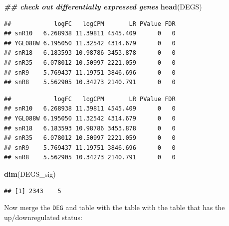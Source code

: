 \documentclass[
]{book}
\newenvironment{Shaded}{\begin{snugshade}}{\end{snugshade}}
\newcommand{\DocumentationTok}[1]{\textcolor[rgb]{0.56,0.35,0.01}{\textbf{\textit{#1}}}}
\newcommand{\FloatTok}[1]{\textcolor[rgb]{0.00,0.00,0.81}{#1}}
\newcommand{\FunctionTok}[1]{\textcolor[rgb]{0.13,0.29,0.53}{\textbf{#1}}}
\newcommand{\NormalTok}[1]{#1}
\newcommand{\OtherTok}[1]{\textcolor[rgb]{0.56,0.35,0.01}{#1}}
\newcommand{\SpecialCharTok}[1]{\textcolor[rgb]{0.81,0.36,0.00}{\textbf{#1}}}
\begin{document}
\begin{Shaded}
\begin{Highlighting}[]
\DocumentationTok{\#\# check out differentially expressed genes}
\FunctionTok{head}\NormalTok{(DEGS)}
\end{Highlighting}
\end{Shaded}

\begin{verbatim}
##            logFC   logCPM       LR PValue FDR
## snR10   6.268938 11.39811 4545.409      0   0
## YGL088W 6.195050 11.32542 4314.679      0   0
## snR18   6.183593 10.98786 3453.878      0   0
## snR35   6.078012 10.50997 2221.059      0   0
## snR9    5.769437 11.19751 3846.696      0   0
## snR8    5.562905 10.34273 2140.791      0   0
\end{verbatim}

\begin{Shaded}
\end{Shaded}

\begin{verbatim}
##            logFC   logCPM       LR PValue FDR
## snR10   6.268938 11.39811 4545.409      0   0
## YGL088W 6.195050 11.32542 4314.679      0   0
## snR18   6.183593 10.98786 3453.878      0   0
## snR35   6.078012 10.50997 2221.059      0   0
## snR9    5.769437 11.19751 3846.696      0   0
## snR8    5.562905 10.34273 2140.791      0   0
\end{verbatim}

\begin{Shaded}
\begin{Highlighting}[]
\FunctionTok{dim}\NormalTok{(DEGS\_sig)}
\end{Highlighting}
\end{Shaded}

\begin{verbatim}
## [1] 2343    5
\end{verbatim}

Now merge the \texttt{DEG} and table with the table with the table that has the up/downregulated status:
\end{document}
